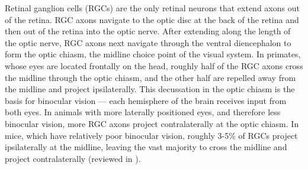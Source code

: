 Retinal ganglion cells (RGCs) are the only retinal neurons that extend axons out of the retina.
RGC axons navigate to the optic disc at the back of the retina and then out of the retina into the optic nerve.
After extending along the length of the optic nerve, RGC axons next navigate through the ventral diencephalon to form the optic chiasm, the midline choice point of the visual system.
In primates, whose eyes are located frontally on the head, roughly half of the RGC axons cross the midline through the optic chiasm, and the other half are repelled away from the midline and project ipsilaterally.
This decussation in the optic chiasm is the basis for binocular vision --- each hemisphere of the brain receives input from both eyes.
In animals with more laterally positioned eyes, and therefore less binocular vision, more RGC axons project contralaterally at the optic chiasm.
In mice, which have relatively poor binocular vision, roughly 3-5\% of RGCs project ipsilaterally at the midline, leaving the vast majority to cross the midline and project contralaterally (reviewed in ).

